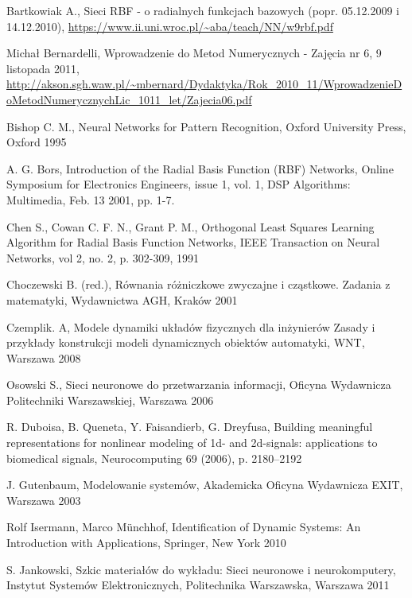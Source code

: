 \begin{thebibliography}{widest-label}

 Bartkowiak A., Sieci RBF - o radialnych funkcjach bazowych (popr. 05.12.2009 i 14.12.2010), \url{https://www.ii.uni.wroc.pl/~aba/teach/NN/w9rbf.pdf}

 Michał Bernardelli, Wprowadzenie do Metod Numerycznych -
Zajęcia nr 6, 9 listopada 2011, \url{http://akson.sgh.waw.pl/~mbernard/Dydaktyka/Rok\_2010\_11/WprowadzenieD oMetodNumerycznychLic\_1011\_let/Zajecia06.pdf}

Bishop C. M., Neural Networks for Pattern Recognition, Oxford University Press, Oxford 1995 

 A. G. Bors, Introduction of the Radial Basis Function (RBF) Networks, Online Symposium for Electronics Engineers, issue 1, vol. 1, DSP Algorithms: Multimedia, Feb. 13 2001, pp. 1-7. 

 Chen S., Cowan C. F. N., Grant P. M., Orthogonal Least Squares Learning Algorithm for Radial Basis Function Networks, IEEE Transaction on Neural Networks, vol 2, no. 2, p. 302-309, 1991

 Choczewski B. (red.), Równania różniczkowe zwyczajne i cząstkowe. Zadania z matematyki, Wydawnictwa AGH, Kraków 2001

 Czemplik. A, Modele dynamiki układów fizycznych dla inżynierów
Zasady i przykłady konstrukcji modeli dynamicznych obiektów automatyki, WNT, Warszawa 2008

Osowski S., Sieci neuronowe do przetwarzania informacji, Oficyna Wydawnicza Politechniki Warszawskiej,  Warszawa 2006

 R. Duboisa, B. Queneta, Y. Faisandierb, G. Dreyfusa, Building meaningful representations for nonlinear modeling of 1d- and 2d-signals: applications to biomedical signals, Neurocomputing 69 (2006), p. 2180–2192

 J. Gutenbaum, Modelowanie systemów, Akademicka Oficyna Wydawnicza EXIT, Warszawa 2003

 Rolf Isermann, Marco Münchhof, Identification of Dynamic Systems: An Introduction with Applications, Springer, New York 2010

 S. Jankowski, Szkic materiałów do wykładu: Sieci neuronowe i neurokomputery, Instytut Systemów Elektronicznych,
Politechnika Warszawska, Warszawa 2011


\end{thebibliography}
